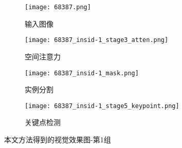\begin{figure*}[htbp]
\begin{minipage}[t]{\linewidth}
		\vskip5pt
		\begin{subfigure}[b]{0.23\linewidth}
			\texttt{[image: 68387.png]}
			\caption{输入图像}
		\end{subfigure}
		\begin{subfigure}[b]{0.23\linewidth}
			\texttt{[image: 68387\_insid-1\_stage3\_atten.png]}
			\caption{空间注意力}
		\end{subfigure}
		\begin{subfigure}[b]{0.23\linewidth}
			\texttt{[image: 68387\_insid-1\_mask.png]}
			\caption{实例分割}
		\end{subfigure}
		\begin{subfigure}[b]{0.23\linewidth}
			\texttt{[image: 68387\_insid-1\_stage5\_keypoint.png]}
			\caption{关键点检测}
		\end{subfigure}
	\end{minipage}
	\caption{本文方法得到的视觉效果图-第1组}
	\label{fig:megavis_a}
\end{figure*}

